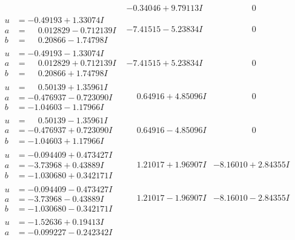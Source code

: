 \documentclass[1p]{elsarticle_modified}
\theoremstyle{definition}
\begin{document}
$$\begin{array}{c|c|c}
 & -0.34046 + 9.79113 I & \phantom{-0.000000 } 0 \\ \hline\begin{aligned}
u &= -0.49193 + 1.33074 I \\
a &= \phantom{-}0.012829 - 0.712139 I \\
b &= \phantom{-}0.20866 - 1.74798 I\end{aligned}
 & -7.41515 - 5.23834 I & \phantom{-0.000000 } 0 \\ \hline\begin{aligned}
u &= -0.49193 - 1.33074 I \\
a &= \phantom{-}0.012829 + 0.712139 I \\
b &= \phantom{-}0.20866 + 1.74798 I\end{aligned}
 & -7.41515 + 5.23834 I & \phantom{-0.000000 } 0 \\ \hline\begin{aligned}
u &= \phantom{-}0.50139 + 1.35961 I \\
a &= -0.476937 - 0.723090 I \\
b &= -1.04603 - 1.17966 I\end{aligned}
 & \phantom{-}0.64916 + 4.85096 I & \phantom{-0.000000 } 0 \\ \hline\begin{aligned}
u &= \phantom{-}0.50139 - 1.35961 I \\
a &= -0.476937 + 0.723090 I \\
b &= -1.04603 + 1.17966 I\end{aligned}
 & \phantom{-}0.64916 - 4.85096 I & \phantom{-0.000000 } 0 \\ \hline\begin{aligned}
u &= -0.094409 + 0.473427 I \\
a &= -3.73968 + 0.43889 I \\
b &= -1.030680 + 0.342171 I\end{aligned}
 & \phantom{-}1.21017 + 1.96907 I & -8.16010 + 2.84355 I \\ \hline\begin{aligned}
u &= -0.094409 - 0.473427 I \\
a &= -3.73968 - 0.43889 I \\
b &= -1.030680 - 0.342171 I\end{aligned}
 & \phantom{-}1.21017 - 1.96907 I & -8.16010 - 2.84355 I \\ \hline\begin{aligned}
u &= -1.52636 + 0.19413 I \\
a &= -0.099227 - 0.242342 I \\

\end{aligned}
\end{array}$$
\end{document}
